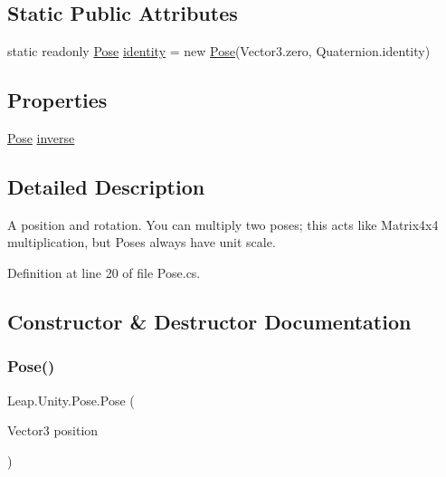 \subsection*{Static Public Attributes}
\begin{DoxyCompactItemize}
\item 
static readonly \mbox{\hyperlink{struct_leap_1_1_unity_1_1_pose}{Pose}} \mbox{\hyperlink{struct_leap_1_1_unity_1_1_pose_ac98b12ebae014198abed5894475be71b}{identity}} = new \mbox{\hyperlink{struct_leap_1_1_unity_1_1_pose}{Pose}}(Vector3.\+zero, Quaternion.\+identity)
\end{DoxyCompactItemize}
\subsection*{Properties}
\begin{DoxyCompactItemize}
\item 
\mbox{\hyperlink{struct_leap_1_1_unity_1_1_pose}{Pose}} \mbox{\hyperlink{struct_leap_1_1_unity_1_1_pose_a223dfc83da978c0ac8f02683acbdc070}{inverse}}
\end{DoxyCompactItemize}


\subsection{Detailed Description}
A position and rotation. You can multiply two poses; this acts like Matrix4x4 multiplication, but Poses always have unit scale. 



Definition at line 20 of file Pose.\+cs.



\subsection{Constructor \& Destructor Documentation}
\mbox{\label{struct_leap_1_1_unity_1_1_pose_a5e5882a2d009bc83f987a5b82d1c4f17}} 
\subsubsection{\texorpdfstring{Pose()}{Pose()}\hspace{0.1cm}{\footnotesize\ttfamily [1/3]}}
{\footnotesize\ttfamily Leap.\+Unity.\+Pose.\+Pose (\begin{DoxyParamCaption}\item[{Vector3}]{position }\end{DoxyParamCaption})}



